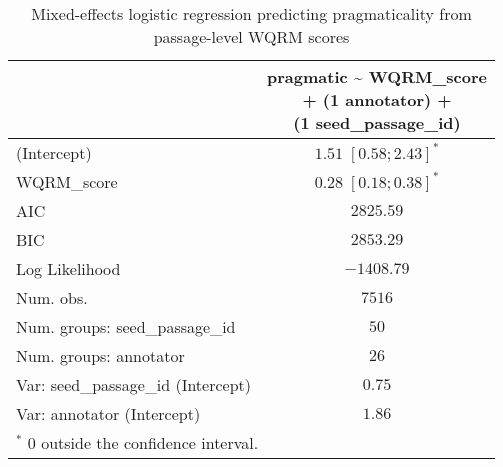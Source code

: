 
\usepackage{booktabs}

\begin{table}[htbp]
\begin{center}
\begin{tabular}{l c}
\toprule
 & \shortstack[l]{pragmatic \textasciitilde{} WQRM\_score  \\ 
+ (1 \textbar{} annotator) + \\ 
(1 \textbar{} seed\_passage\_id)} \\
\midrule
(Intercept)                        & $1.51 \; [0.58; 2.43]^{*}$ \\
WQRM\_score                        & $0.28 \; [0.18; 0.38]^{*}$ \\
\midrule
AIC                                & $2825.59$                  \\
BIC                                & $2853.29$                  \\
Log Likelihood                     & $-1408.79$                 \\
Num. obs.                          & $7516$                     \\
Num. groups: seed\_passage\_id     & $50$                       \\
Num. groups: annotator             & $26$                       \\
Var: seed\_passage\_id (Intercept) & $0.75$                     \\
Var: annotator (Intercept)         & $1.86$                     \\
\bottomrule
\multicolumn{2}{l}{\scriptsize{$^*$ 0 outside the confidence interval.}}
\end{tabular}
\caption{Mixed-effects logistic regression predicting pragmaticality from passage-level WQRM scores}
\label{tab:glmer_nov_src_front}
\end{center}
\end{table}
